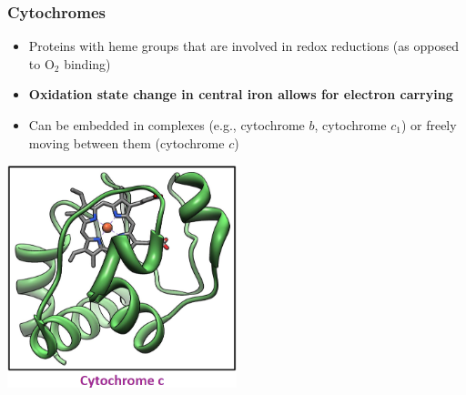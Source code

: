 \documentclass[10pt]{article}
\begin{document}
\subsubsection*{Cytochromes}
\begin{itemize}
	\item Proteins with heme groups that are involved in redox reductions (as opposed to O$_2$ binding)
	\item \textbf{Oxidation state change in central iron allows for electron carrying}
	\item Can be embedded in complexes (e.g., cytochrome $b$, cytochrome $c_1$) or freely moving between them (cytochrome $c$)
\end{itemize}
\begin{center} 
	\includegraphics*[width=0.5\textwidth]{L2_13.png} 
\end{center}
\end{document}
